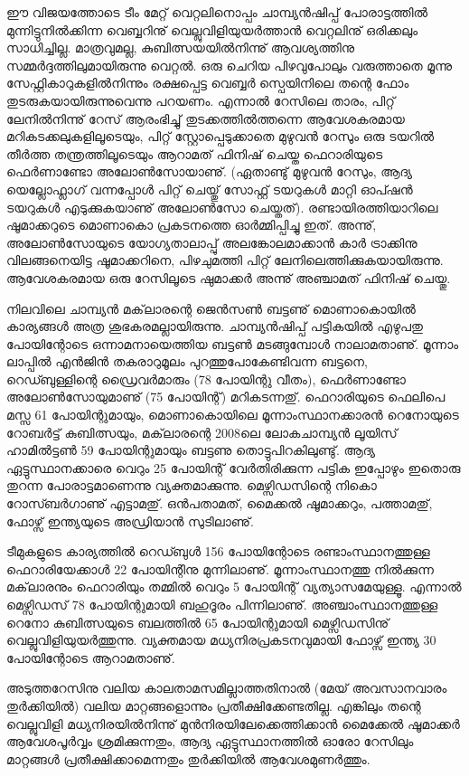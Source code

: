 ഈ വിജയത്തോടെ ടീം മേറ്റ് വെറ്റലിനൊപ്പം ചാമ്പ്യന്‍ഷിപ്പ് പോരാട്ടത്തില്‍ മുന്നിട്ടുനില്‍ക്കിന്ന വെബ്ബറിനു് 
വെല്ലുവിളിയുയര്‍ത്താന്‍ വെറ്റലിനു് ഒരിക്കലും സാധിച്ചില്ല. മാത്രവുമല്ല, കുബിത്സയയില്‍നിന്നു് ആവശ്യത്തിനു 
സമ്മര്‍ദ്ദത്തിലുമായിരുന്നു വെറ്റല്‍. ഒരു ചെറിയ പിഴവുപോലും വരുത്താതെ മൂന്നു സേഫ്റ്റികാറുകളില്‍നിന്നും രക്ഷപ്പെട്ട 
വെബ്ബര്‍ സ്പെയിനിലെ തന്റെ ഫോം തുടരുകയായിരുന്നുവെന്നു പറയണം. എന്നാല്‍ റേസിലെ താരം, പിറ്റ് ലേനില്‍നിന്നു് 
റേസ് ആരംഭിച്ചു് തുടക്കത്തില്‍ത്തന്നെ ആവേശകരമായ മറികടക്കലുകളിലൂടെയും, പിറ്റ് സ്റ്റോപ്പെടുക്കാതെ മുഴുവന്‍ റേസും 
ഒരു ടയറില്‍ തീര്‍ത്ത തന്ത്രത്തിലൂടെയും ആറാമത് ഫിനിഷ് ചെയ്ത ഫെറാരിയുടെ ഫെര്‍ണാണ്ടോ അലോണ്‍സോയാണു്. 
(ഏതാണ്ടു് മുഴുവന്‍ റേസും, ആദ്യ യെല്ലോഫ്ലാഗ് വന്നപ്പോള്‍ പിറ്റ് ചെയ്തു് സോഫ്റ്റ് ടയറുകള്‍ മാറ്റി ഓപ്ഷന്‍ ടയറുകള്‍ 
എടുക്കുകയാണു് അലോണ്‍സോ ചെയ്തത്). രണ്ടായിരത്തിയാറിലെ ഷൂമാക്കറുടെ മൊണാകൊ പ്രകടനത്തെ ഓര്‍മ്മിപ്പിച്ചു 
ഇത്. അന്നു്, അലോണ്‍സോയുടെ യോഗ്യതാലാപ്പു് അലങ്കോലമാക്കാന്‍ കാര്‍ ട്രാക്കിനു വിലങ്ങനെയിട്ട ഷൂമാക്കറിനെ, 
പിഴചുമത്തി പിറ്റ് ലേനിലെത്തിക്കുകയായിരുന്നു. ആവേശകരമായ ഒരു റേസിലൂടെ ഷുമാക്കര്‍ അന്നു് അഞ്ചാമത് ഫിനിഷ് 
ചെയ്തു.

നിലവിലെ ചാമ്പ്യന്‍ മക്‌ലാരന്റെ ജെന്‍സണ്‍ ബട്ടണു് മൊണാകൊയില്‍ കാര്യങ്ങള്‍ അത്ര ശുഭകരമല്ലായിരുന്നു. 
ചാമ്പ്യന്‍ഷിപ്പ് പട്ടികയില്‍ എഴുപതു പോയിന്റോടെ ഒന്നാമനായെത്തിയ ബട്ടണ്‍ മടങ്ങുമ്പോള്‍ നാലാമതാണു്. മൂന്നാം 
ലാപ്പില്‍ എന്‍ജിന്‍ തകരാറുമൂലം പുറത്തുപോകേണ്ടിവന്ന ബട്ടനെ, റെഡ്ബുള്ളിന്റെ ഡ്രൈവര്‍മാരും (78 പോയിന്റു വീതം),
ഫെര്‍ണാണ്ടോ അലോണ്‍സോയുമാണു് (75 പോയിന്റ്) മറികടന്നതു്. ഫെറാരിയുടെ ഫെലിപെ മസ്സ 61 പോയിന്റുമായും, 
മൊണാകൊയിലെ മൂന്നാംസ്ഥാനക്കാരന്‍ റെനോയുടെ റോബര്‍ട്ട് കുബിത്സയും, മക്‌ലാരന്റെ 2008ലെ ലോകചാമ്പ്യന്‍ 
ലൂയിസ് ഹാമില്‍ട്ടണ്‍ 59 പോയിന്റുമായും ബട്ടണു തൊട്ടുപിറകിലുണ്ടു്. ആദ്യ ഏട്ടുസ്ഥാനക്കാരെ വെറും 25 പോയിന്റ് 
വേര്‍തിരിക്കുന്ന പട്ടിക ഇപ്പോഴും ഇതൊരു തുറന്ന പോരാട്ടമാണെന്നു വ്യക്തമാക്കുന്നു. മെഴ്സിഡസിന്റെ നികൊ 
റോസ്ബര്‍ഗാണു് എട്ടാമതു്. ഒന്‍പതാമത്, മൈക്കല്‍ ഷൂമാക്കറും, പത്താമതു്, ഫോഴ്സ് ഇന്ത്യയുടെ അഡ്രിയാന്‍ സുടിലാണു്.

ടീമുകളുടെ കാര്യത്തില്‍ റെഡ്ബുള്‍ 156 പോയിന്റോടെ രണ്ടാംസ്ഥാനത്തുള്ള ഫെറാരിയേക്കാള്‍ 22 പോയിന്റിനു 
മുന്നിലാണു്. മൂന്നാംസ്ഥാനത്തു നില്‍ക്കുന്ന മക്‌ലാരനും ഫെറാരിയും തമ്മില്‍ വെറും 5 പോയിന്റ് വ്യത്യാസമേയുള്ളൂ. 
എന്നാല്‍ മെഴ്സിഡസ് 78 പോയിന്റുമായി ബഹുദൂരം പിന്നിലാണു്. അഞ്ചാംസ്ഥാനത്തുള്ള റെനോ കുബിത്സയുടെ 
ബലത്തില്‍ 65 പോയിന്റുമായി മെഴ്സിഡസിനു് വെല്ലുവിളിയുയര്‍ത്തുന്നു. വ്യക്തമായ മധ്യനിരപ്രകടനവുമായി ഫോഴ്സ് 
ഇന്ത്യ 30 പോയിന്റോടെ ആറാമതാണു്.

അടുത്തറേസിനു വലിയ കാലതാമസമില്ലാത്തതിനാല്‍ (മേയ് അവസാനവാരം തുര്‍ക്കിയില്‍) വലിയ മാറ്റങ്ങളൊന്നും 
പ്രതീക്ഷിക്കേണ്ടതില്ല. എങ്കിലും തന്റെ വെല്ലുവിളി മധ്യനിരയില്‍നിന്നു് മുന്‍നിരയിലേക്കെത്തിക്കാന്‍ മൈക്കേല്‍ ഷൂമാക്കര്‍ 
ആവേശപൂര്‍വ്വം ശ്രമിക്കുന്നതും, ആദ്യ ഏട്ടുസ്ഥാനത്തില്‍ ഓരോ റേസിലും മാറ്റങ്ങള്‍ പ്രതീക്ഷിക്കാമെന്നതും തുര്‍ക്കിയില്‍ 
ആവേശമുണര്‍ത്തും.

